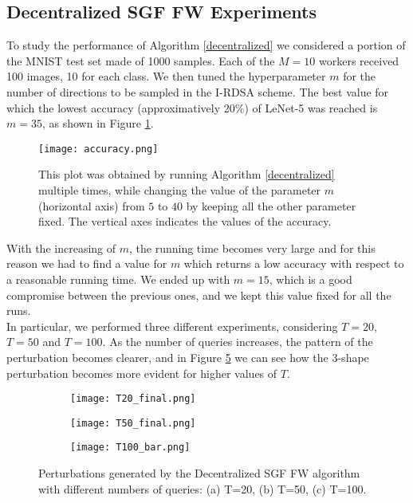 \subsection{Decentralized SGF FW Experiments}
To study the performance of Algorithm \ref{decentralized} we considered a portion of the MNIST test set made of 1000 samples. Each of the $M=10$ workers received 100 images, 10 for each class.
We then tuned the hyperparameter $m$ for the number of directions to be sampled in the I-RDSA scheme. The best value for which the lowest accuracy (approximatively 20\%) of LeNet-5 was reached is $m=35$, as shown in Figure \ref{fig:accuracy}.\\
\begin{figure}[htbp]
	\centering
	\texttt{[image: accuracy.png]}
	\caption{{\small This plot was obtained by running Algorithm \ref{decentralized} multiple times, while changing the value of the parameter $m$ (horizontal axis) from $5$ to $40$ by keeping all the other parameter fixed. The vertical axes indicates the values of the accuracy.}}
	\label{fig:accuracy}
\end{figure}
\indent With the increasing of $m$, the running time becomes very large and for this reason we had to find a value for $m$ which returns a low accuracy with respect to a reasonable running time. We ended up with $m=15$, which is a good compromise between the previous ones, and we kept this value fixed for all the runs.\\
\indent In particular, we performed three different experiments, considering $T=20$, $T=50$ and $T=100$. As the number of queries increases, the pattern of the perturbation becomes clearer, and in Figure \ref{fig:decentralized_perturbations} we can see how the 3-shape perturbation becomes more evident for higher values of $T$. 
\begin{figure}[h]
	\centering
	\begin{subfigure}[b]{0.15\textwidth}
		\centering
		\texttt{[image: T20\_final.png]}
		\caption{}
		\label{fig:decentralized_perturbation_20}
	\end{subfigure}
	\hfill
	\begin{subfigure}[b]{0.15\textwidth}
		\texttt{[image: T50\_final.png]}
		\caption{}
		\label{fig:decentralized_perturbation_50}
	\end{subfigure}
	\hfill
	\begin{subfigure}[b]{0.15\textwidth}
		\texttt{[image: T100\_bar.png]}
		\caption{}
		\label{fig:decentralized_perturbation_100}
	\end{subfigure}
	\caption{{\small Perturbations generated by the Decentralized SGF FW algorithm with different numbers of queries: (a) T=20, (b) T=50, (c) T=100.}}
	\label{fig:decentralized_perturbations}
\end{figure}

